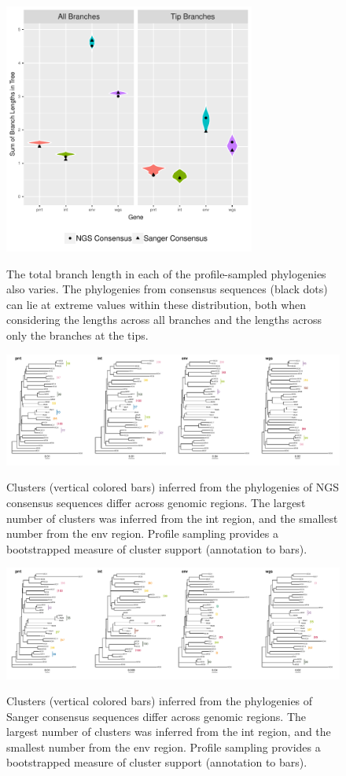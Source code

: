 \documentclass[letterpaper]{article}
\begin{document}
\begin{figure}[p!]
	\caption{The total branch length in each of the profile-sampled phylogenies also varies. The phylogenies from consensus sequences (black dots) can lie at extreme values within these distribution, both when considering the lengths across all branches and the lengths across only the branches at the tips.}
	\centering
	\includegraphics[width=3.25in]{Figure3}
	\label{fig3}
\end{figure}

\begin{figure}[p!]
	\caption{Clusters (vertical colored bars) inferred from the phylogenies of NGS consensus sequences differ across genomic regions. The largest number of clusters was inferred from the int region, and the smallest number from the env region. Profile sampling provides a bootstrapped measure of cluster support (annotation to bars).}
	\centering
	\includegraphics[width=\linewidth]{Figure4}
	\label{fig4}
\end{figure}

\begin{figure}[p!]
	\caption{Clusters (vertical colored bars) inferred from the phylogenies of Sanger consensus sequences differ across genomic regions. The largest number of clusters was inferred from the int region, and the smallest number from the env region. Profile sampling provides a bootstrapped measure of cluster support (annotation to bars).}
	\centering
	\includegraphics[width=\linewidth]{Figure5}
	\label{fig5}
\end{figure}
\end{document}
